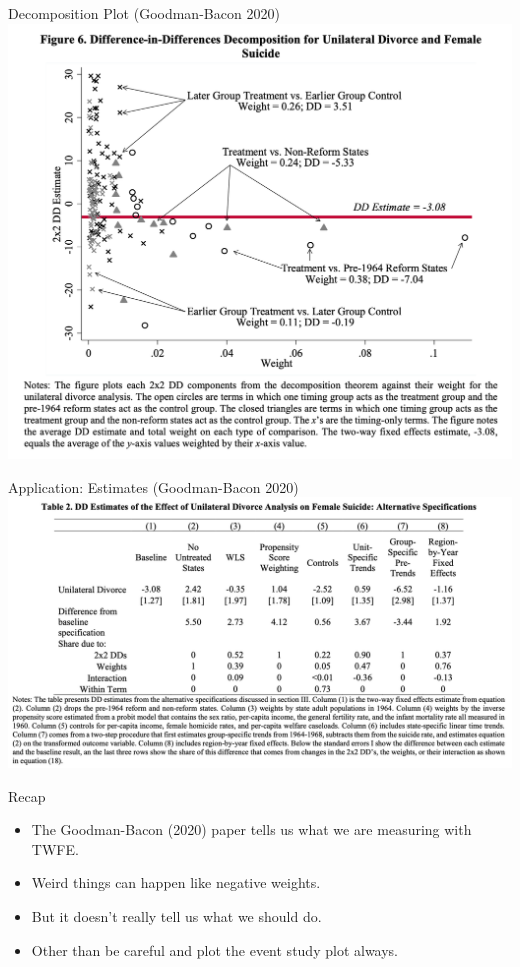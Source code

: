 \documentclass[xcolor=pdftex,dvipsnames,table,mathserif,aspectratio=169]{beamer}
\begin{document}
\begin{frame}{Decomposition Plot (Goodman-Bacon 2020)}
\centering
\includegraphics[height=0.9\textheight]{resources/gb_fig6.png}
\end{frame}

\begin{frame}{Application: Estimates (Goodman-Bacon 2020)}
\centering
\includegraphics[height=0.9\textheight]{resources/gb_tab2.png}
\end{frame}


\begin{frame}{Recap}
\begin{itemize}
\item The Goodman-Bacon (2020) paper tells us what we \alert{are} measuring with TWFE.
\item Weird things can happen like \alert{negative weights}.
\item But it doesn't really tell us what we \alert{should do}.
\item Other than be careful and plot the \alert{event study} plot always.
\end{itemize}

\end{frame}
\end{document}
